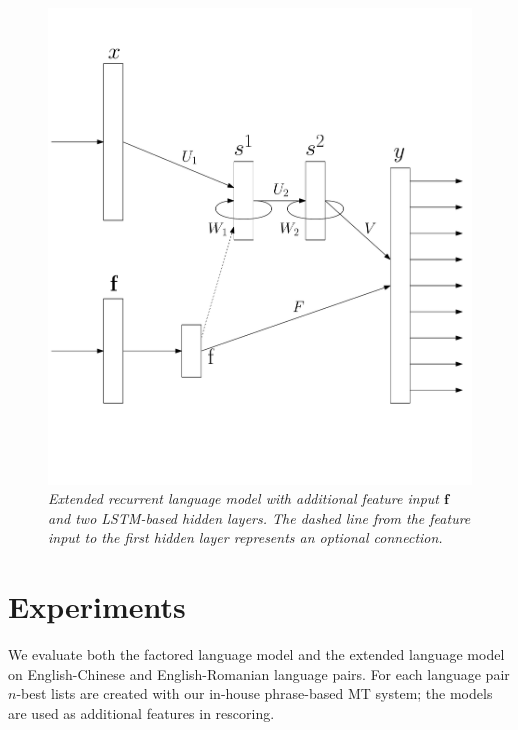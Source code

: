 \documentclass[a4paper]{article}
\begin{document}
\begin{figure} 
\centering 
\includegraphics[width=\columnwidth]{ModelExtended2.pdf}
\caption{\it Extended recurrent language model with additional feature input $\textbf{f}$ and two LSTM-based hidden layers. The dashed line from the feature input to the first hidden layer represents an optional connection.}
\label{fig:model-extended}
\end{figure}


\section{Experiments}
We evaluate both the factored language model and the extended language model on English-Chinese and English-Romanian language pairs. For each language pair $n$-best lists are created with our in-house phrase-based MT system; the models are used as additional features in rescoring.
\end{document}
